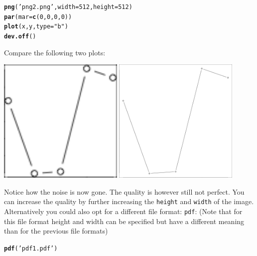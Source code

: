 \documentclass[12pt,a4paper]{article}\usepackage[]{graphicx}\usepackage[]{color}
\makeatletter
\newcommand{\hlnum}[1]{\textcolor[rgb]{0.686,0.059,0.569}{#1}}%
\newcommand{\hlstr}[1]{\textcolor[rgb]{0.192,0.494,0.8}{#1}}%
\newcommand{\hlstd}[1]{\textcolor[rgb]{0.345,0.345,0.345}{#1}}%
\newcommand{\hlkwc}[1]{\textcolor[rgb]{0.333,0.667,0.333}{#1}}%
\newcommand{\hlkwd}[1]{\textcolor[rgb]{0.737,0.353,0.396}{\textbf{#1}}}%
\newenvironment{kframe}{%
 \def\at@end@of@kframe{}%
 \ifinner\ifhmode%
  \def\at@end@of@kframe{\end{minipage}}%
  \begin{minipage}{\columnwidth}%
 \fi\fi%
 \def\FrameCommand##1{\hskip\@totalleftmargin \hskip-\fboxsep
 \colorbox{shadecolor}{##1}\hskip-\fboxsep
     \hskip-\linewidth \hskip-\@totalleftmargin \hskip\columnwidth}%
 \MakeFramed {\advance\hsize-\width
   \@totalleftmargin\z@ \linewidth\hsize
   \@setminipage}}%
 {\par\unskip\endMakeFramed%
 \at@end@of@kframe}
\newenvironment{knitrout}{}{} %
\makeatother
\begin{document}
\begin{mdframed}
\begin{knitrout}
\begin{kframe}
\begin{alltt}
\hlkwd{png}\hlstd{(}\hlstr{'png2.png'}\hlstd{,}\hlkwc{width}\hlstd{=}\hlnum{512}\hlstd{,}\hlkwc{height}\hlstd{=}\hlnum{512}\hlstd{)}
\hlkwd{par}\hlstd{(}\hlkwc{mar}\hlstd{=}\hlkwd{c}\hlstd{(}\hlnum{0}\hlstd{,}\hlnum{0}\hlstd{,}\hlnum{0}\hlstd{,}\hlnum{0}\hlstd{))}
\hlkwd{plot}\hlstd{(x,y,}\hlkwc{type}\hlstd{=}\hlstr{"b"}\hlstd{)}
\hlkwd{dev.off}\hlstd{()}
\end{alltt}
\end{kframe}
\end{knitrout}
Compare the following two plots:
\begin{center}
\includegraphics[width=0.45\textwidth]{png1.png}
\includegraphics[width=0.45\textwidth]{png2.png}
\end{center}
Notice how the noise is now gone. The quality is however still not perfect. You can increase the quality by further increasing the \texttt{height} and \texttt{width} of the image. Alternatively you could also opt for a different file format: \texttt{pdf}: (Note that for this file format height and width can be specified but have a different meaning than for the previous file formats)
\begin{knitrout}
\color{fgcolor}\begin{kframe}
\begin{alltt}
\hlkwd{pdf}\hlstd{(}\hlstr{'pdf1.pdf'}\hlstd{)}

\end{alltt}
\end{kframe}
\end{knitrout}
\end{mdframed}
\end{document}
